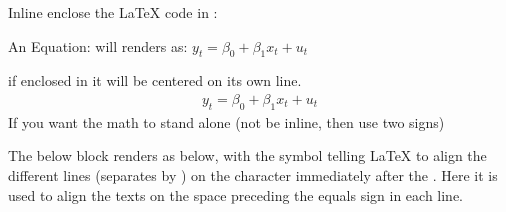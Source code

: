 \documentclass[letterpaper,10pt,english]{jupyterBook}
\begin{document}
\sphinxAtStartPar
Inline enclose the LaTeX code in \sphinxcode{\sphinxupquote{\$}}:

\sphinxAtStartPar
An Equation:  will renders as: \(y_t = \beta_0 + \beta_1 x_t + u_t\)

\sphinxAtStartPar
if enclosed in \sphinxcode{\sphinxupquote{\$\$}} \sphinxcode{\sphinxupquote{\$\$}} it will be centered on its own line.
\begin{equation*}
\begin{split}y_t = \beta_0 + \beta_1 x_t + u_t\end{split}
\end{equation*}
\sphinxAtStartPar
If you want the math to stand alone (not be in\sphinxhyphen{}line, then use two \sphinxcode{\sphinxupquote{\$}} signs)

\sphinxAtStartPar
The below block renders as below, with the \sphinxcode{\sphinxupquote{\&}} symbol telling LaTeX to align the different lines (separates by \sphinxcode{\sphinxupquote{\textbackslash{}\textbackslash{}}}) on the character immediately after the \sphinxcode{\sphinxupquote{\&}}. Here it is used to align the texts on the space preceding the equals sign in each line.
\end{document}
